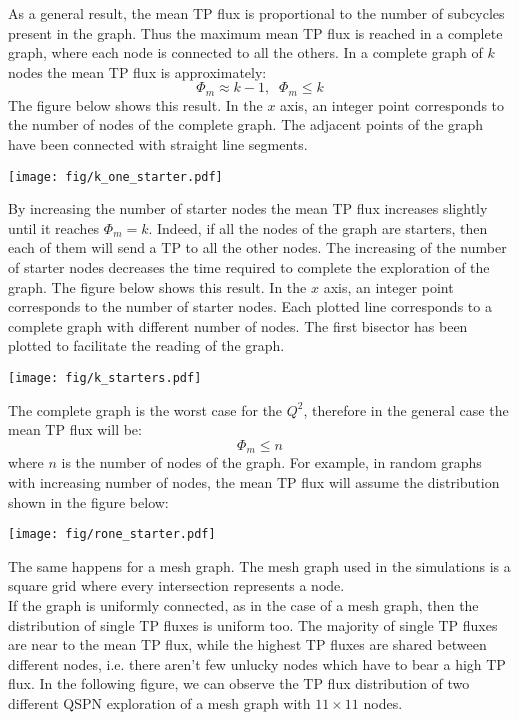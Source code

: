 \documentclass[a4paper]{article}
\begin{document}
As a general result, the mean TP flux is proportional to the number of
subcycles present in the graph. Thus the maximum mean TP flux is reached in a
complete graph, where each node is connected to all the others. In a complete
graph of $k$ nodes the mean TP flux is approximately:
\[
	\Phi_m \approx k-1,\;\; \Phi_m \le k
\]
The figure below shows this result. In the $x$ axis, an integer point
corresponds to the number of nodes of the complete graph. The adjacent points of the
graph have been connected  with straight line segments.
\begin{center}
\label{fig:k_one_starter}
\texttt{[image: fig/k\_one\_starter.pdf]}
\end{center}
By increasing the number of starter nodes the
mean TP flux increases slightly until it reaches $\Phi_m=k$. Indeed, if all the
nodes of the graph are starters, then each of them will send a TP to all the
other nodes. The increasing of the number of starter nodes decreases the time required
to complete the exploration of the graph.
The figure below shows this result. In the $x$ axis, an integer point
corresponds to the number of starter nodes. Each plotted line corresponds to a
complete graph with different number of nodes. The first bisector has been
plotted to facilitate the reading of the graph.
\begin{center}
\label{fig:k_starters}
\texttt{[image: fig/k\_starters.pdf]}
\end{center}
The complete graph is the worst case for the $Q^2$, therefore in the general case the mean TP flux will be:
\[ \Phi_m \le n \]
where $n$ is the number of nodes of the graph.
For example, in random graphs with increasing number of nodes, the mean TP
flux will assume the distribution shown in the figure below:
\begin{center}
\label{fig:rone_starter}
\texttt{[image: fig/rone\_starter.pdf]}
\end{center}
The same happens for a mesh graph. The mesh graph used in the simulations
is a square grid where every intersection represents a node.\\
If the graph is uniformly connected, as in the case of a mesh graph, then the
distribution of single TP fluxes is uniform too.
The majority of single TP fluxes are near to the mean TP
flux, while the highest TP fluxes are shared between different nodes, i.e.
there aren't few unlucky nodes which have to bear a high TP flux.
In the following figure, we can observe the TP flux distribution
of two different QSPN exploration of a mesh graph with $11\times11$ nodes.
\end{document}
